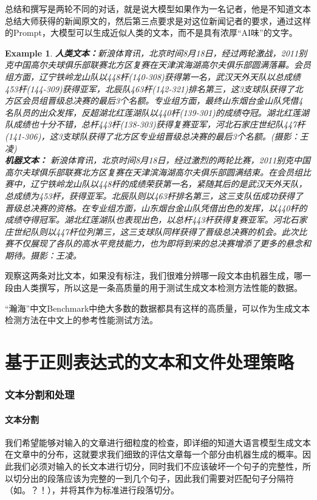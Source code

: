 \documentclass[a4paper]{report}
\newtheorem{example}{Example}
\begin{document}
总结和撰写是两轮不同的对话，就是说大模型如果作为一名记者，他是不知道文本总结大师获得的新闻原文的，然后第三点要求是对这位新闻记者的要求，通过这样的Prompt，大模型可以生成近似人类的文本，而不是具有浓厚“AI味”的文字。
\begin{example}
	\textbf{人类文本：}新浪体育讯，北京时间8月18日，经过两轮激战，2011别克中国高尔夫球俱乐部联赛北方区复赛在天津滨海湖高尔夫俱乐部圆满落幕。会员组方面，辽宁铁岭龙山队以448杆(140-308)获得第一名，武汉天外天队以总成绩453杆(144-309)获得亚军，北辰队463杆(142-321)排名第三，这3支球队获得了北方区会员组晋级总决赛的最后3个名额。专业组方面，最终山东烟台金山队凭借4名队员的出众发挥，反超湖北红莲湖队以440杆(139-301)的成绩夺冠。湖北红莲湖队成绩也十分不错，总杆443杆(138-303)获得复赛亚军，河北石家庄世纪队447杆(141-306)，这3支球队获得了北方区专业组晋级总决赛的最后3个名额。(摄影：王凌)\\
	\textbf{机器文本：} 新浪体育讯，北京时间8月18日，经过激烈的两轮比赛，2011别克中国高尔夫球俱乐部联赛北方区复赛在天津滨海湖高尔夫俱乐部圆满结束。在会员组比赛中，辽宁铁岭龙山队以448杆的成绩荣获第一名，紧随其后的是武汉天外天队，总成绩为453杆，获得亚军。北辰队则以463杆排名第三，这三支队伍成功获得了晋级总决赛的资格。在专业组方面，山东烟台金山队凭借出色的发挥，以440杆的成绩夺得冠军。湖北红莲湖队也表现出色，以总杆443杆获得复赛亚军。河北石家庄世纪队则以447杆位列第三，这三支球队同样获得了晋级总决赛的机会。此次比赛不仅展现了各队的高水平竞技能力，也为即将到来的总决赛增添了更多的悬念和期待。摄影：王凌。
\end{example}
观察这两条对比文本，如果没有标注，我们很难分辨哪一段文本由机器生成，哪一段由人类撰写，所以这是一条高质量的用于测试生成文本检测方法性能的数据。

“瀚海”中文Benchmark中绝大多数的数据都具有这样的高质量，可以作为生成文本检测方法在中文上的参考性能测试方法。


\section{基于正则表达式的文本和文件处理策略}
\subsubsection{文本分割和处理}
\paragraph{文本分割}
我们希望能够对输入的文章进行细粒度的检查，即详细的知道大语言模型生成文本在文章中的分布，这就要求我们细致的评估文章每一个部分由机器生成的概率。因此我们必须对输入的长文本进行切分，同时我们不应该破坏一个句子的完整性，所以切分出的段落应该为完整的一到几个句子，因此我们需要对匹配句子分隔符（如。？！），并将其作为标准进行段落切分。
\end{document}
